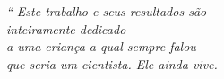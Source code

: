 \begin{epigrafe}
	\vspace*{\fill}
	\begin{flushright}
		\textit{``
		Este trabalho e seus resultados são
		\\ inteiramente dedicado 
		\\ a uma criança a qual sempre falou 
		\\ que seria um cientista. Ele ainda vive.}
	\end{flushright}
\end{epigrafe}
